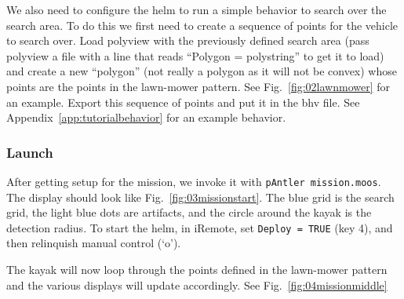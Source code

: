 We also need to configure the helm to run a simple behavior to search over the search area.  To do this we first need to create a sequence of points for the vehicle to search over.  Load polyview with the previously defined search area (pass polyview a file with a line that reads ``Polygon = polystring'' to get it to load) and create a new ``polygon'' (not really a polygon as it will not be convex) whose points are the points in the lawn-mower pattern.  See Fig.~\ref{fig:02lawnmower} for an example.  Export this sequence of points and put it in the bhv file.  See Appendix~\ref{app:tutorialbehavior} for an example behavior.


\subsubsection{Launch}
\label{ex:tutorial:launch}
After getting setup for the mission, we invoke it with {\tt pAntler~mission.moos}.  The display should look like Fig.~\ref{fig:03missionstart}.  The blue grid is the search grid, the light blue dots are artifacts, and the circle around the kayak is the detection radius.  To start the helm, in iRemote, set {\tt Deploy = TRUE} (key 4), and then relinquish manual control (`o').


The kayak will now loop through the points defined in the lawn-mower pattern and the various displays will update accordingly.  See Fig.~\ref{fig:04missionmiddle}

